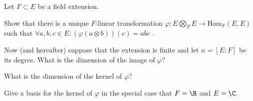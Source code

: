 Let $F\subset E$ be a field extension. 
\begin{alist}
\item Show that there is a unique $F$-linear transformation 
$\varphi:E \bigotimes_F E\rightarrow \mathrm{Hom}_F(E,E)$ such that
$\forall a,b,c\in E:(\varphi(a\otimes b))(c)=abc$ .
\item Now (and hereafter) suppose that the extension is finite and 
let $n=[E:F]$ be its degree. What is the dimension of the image of 
$\varphi$?
\item What is the dimension of the kernel of $\varphi$?
\item Give a basis for the kernel of $\varphi$ in the special case
that $F=\R$ and $E=\C$.
\end{alist}
